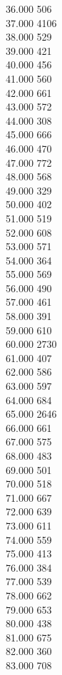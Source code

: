 { 36.000	506 \\
 37.000	4106 \\
 38.000	529 \\
 39.000	421 \\
 40.000	456 \\
 41.000	560 \\
 42.000	661 \\
 43.000	572 \\
 44.000	308 \\
 45.000	666 \\
 46.000	470 \\
 47.000	772 \\
 48.000	568 \\
 49.000	329 \\
 50.000	402 \\
 51.000	519 \\
 52.000	608 \\
 53.000	571 \\
 54.000	364 \\
 55.000	569 \\
 56.000	490 \\
 57.000	461 \\
 58.000	391 \\
 59.000	610 \\
 60.000	2730 \\
 61.000	407 \\
 62.000	586 \\
 63.000	597 \\
 64.000	684 \\
 65.000	2646 \\
 66.000	661 \\
 67.000	575 \\
 68.000	483 \\
 69.000	501 \\
 70.000	518 \\
 71.000	667 \\
 72.000	639 \\
 73.000	611 \\
 74.000	559 \\
 75.000	413 \\
 76.000	384 \\
 77.000	539 \\
 78.000	662 \\
 79.000	653 \\
 80.000	438 \\
 81.000	675 \\
 82.000	360 \\
 83.000	708 \\
}
